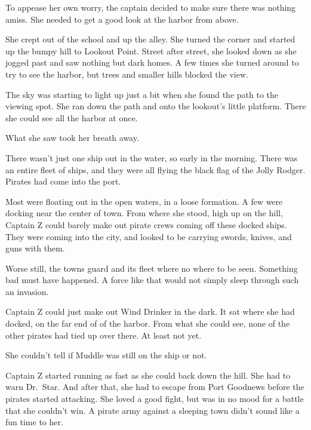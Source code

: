 \documentclass[12pt]{extbook}
\begin{document}
  To appease her own worry, the captain decided to make sure there was
  nothing amiss. She needed to get a good look at the harbor from above.
  
  She crept out of the school and up the alley. She turned the corner and
  started up the bumpy hill to Lookout Point. Street after street, she
  looked down as she jogged past and saw nothing but dark homes. A few
  times she turned around to try to see the harbor, but trees and smaller
  hills blocked the view.
  
  The sky was starting to light up just a bit when she found the path to
  the viewing spot. She ran down the path and onto the lookout's little
  platform. There she could see all the harbor at once.
  
  What she saw took her breath away.
  
  There wasn't just one ship out in the water, so early in the morning.
  There was an entire fleet of ships, and they were all flying the black
  flag of the Jolly Rodger. Pirates had come into the port.
  
  Most were floating out in the open waters, in a loose formation. A few
  were docking near the center of town. From where she stood, high up on
  the hill, Captain Z could barely make out pirate crews coming off these
  docked ships. They were coming into the city, and looked to be carrying
  swords, knives, and guns with them.
  
  Worse still, the towns guard and its fleet where no where to be seen.
  Something bad must have happened. A force like that would not simply
  sleep through such an invasion.
  
  Captain Z could just make out Wind Drinker in the dark. It sat where she
  had docked, on the far end of of the harbor. From what she could see,
  none of the other pirates had tied up over there. At least not yet.
  
  She couldn't tell if Muddle was still on the ship or not.
  
  Captain Z started running as fast as she could back down the hill. She
  had to warn Dr.~Star. And after that, she had to escape from Port
  Goodnews before the pirates started attacking. She loved a good fight,
  but was in no mood for a battle that she couldn't win. A pirate army
  against a sleeping town didn't sound like a fun time to her.
  
  \section{}\label{section-36}
  
\end{document}
